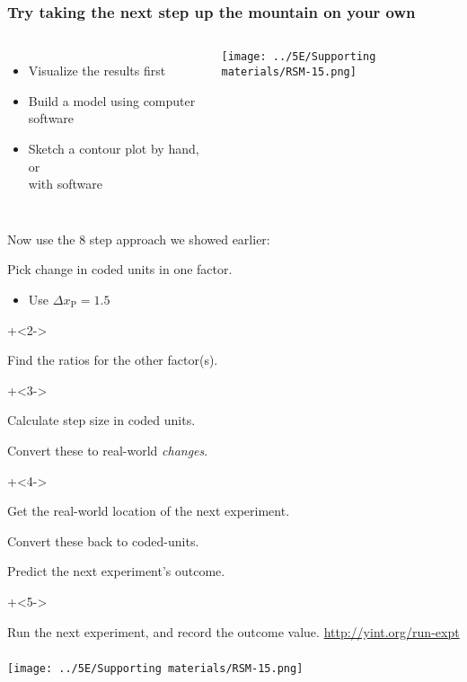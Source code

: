 \begin{frame}\frametitle{Try taking the next step up the mountain on your own}
	
	\begin{columns}[T]
		
			\begin{itemize}
				\item	Visualize the results first
				\item	Build a model using computer software
				\item	Sketch a contour plot by hand, or \\with software
			\end{itemize}
			\centerline{\texttt{[image: ../5E/Supporting materials/RSM-15.png]}}
	\end{columns}
	
	\pause
	\vspace{-2.5cm}
	{\color{myOrange}Now use the 8 step approach we showed earlier:}
	\vspace{0.2cm}
	\begin{enumerate}

			\item	Pick change in coded units in one factor. 
				\begin{itemize}
					\item	Use $\Delta x_\text{P}= 1.5$
				\end{itemize}
			\onslide+<2->{
				\item	Find the ratios for the other factor(s).
			}
			\onslide+<3->{
				\item	Calculate step size in coded units.
				\item	Convert these to real-world \emph{changes}.
			}
			\onslide+<4->{
				\item	Get the real-world location	of the next experiment.
				\item	Convert these back to coded-units.
				\item	Predict the next experiment's outcome.
			}
			\onslide+<5->{
				\item	Run the next experiment, and record the outcome value.  \href{http://yint.org/run-expt}{http://yint.org/run-expt}
			}
	\end{enumerate}
	
\end{frame}

\begin{frame}\frametitle{}
	\centerline{\texttt{[image: ../5E/Supporting materials/RSM-15.png]}}
\end{frame}




